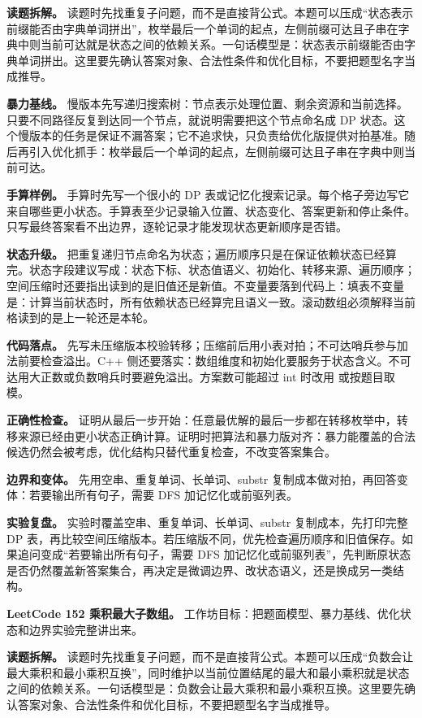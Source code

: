 \textbf{读题拆解。} 读题时先找重复子问题，而不是直接背公式。本题可以压成“状态表示前缀能否由字典单词拼出”，枚举最后一个单词的起点，左侧前缀可达且子串在字典中则当前可达就是状态之间的依赖关系。一句话模型是：状态表示前缀能否由字典单词拼出。这里要先确认答案对象、合法性条件和优化目标，不要把题型名字当成推导。

\textbf{暴力基线。} 慢版本先写递归搜索树：节点表示处理位置、剩余资源和当前选择。只要不同路径反复到达同一个节点，就说明需要把这个节点命名成 DP 状态。这个慢版本的任务是保证不漏答案；它不追求快，只负责给优化版提供对拍基准。随后再引入优化抓手：枚举最后一个单词的起点，左侧前缀可达且子串在字典中则当前可达。

\textbf{手算样例。} 手算时先写一个很小的 DP 表或记忆化搜索记录。每个格子旁边写它来自哪些更小状态。手算表至少记录输入位置、状态变化、答案更新和停止条件。只写最终答案看不出边界，逐轮记录才能发现状态更新顺序是否错。

\textbf{状态升级。} 把重复递归节点命名为状态；遍历顺序只是在保证依赖状态已经算完。状态字段建议写成：状态下标、状态值语义、初始化、转移来源、遍历顺序；空间压缩时还要指出读到的是旧值还是新值。不变量要落到代码上：填表不变量是：计算当前状态时，所有依赖状态已经算完且语义一致。滚动数组必须解释当前格读到的是上一轮还是本轮。

\textbf{代码落点。} 先写未压缩版本校验转移；压缩前后用小表对拍；不可达哨兵参与加法前要检查溢出。C++ 侧还要落实：数组维度和初始化要服务于状态含义。不可达用大正数或负数哨兵时要避免溢出。方案数可能超过 int 时改用  或按题目取模。

\textbf{正确性检查。} 证明从最后一步开始：任意最优解的最后一步都在转移枚举中，转移来源已经由更小状态正确计算。证明时把算法和暴力版对齐：暴力能覆盖的合法候选仍然会被考虑，优化结构只替代重复检查，不改变答案集合。

\textbf{边界和变体。} 先用空串、重复单词、长单词、substr 复制成本做对拍，再回答变体：若要输出所有句子，需要 DFS 加记忆化或前驱列表。

\textbf{实验复盘。} 实验时覆盖空串、重复单词、长单词、substr 复制成本，先打印完整 DP 表，再比较空间压缩版本。若压缩版不同，优先检查遍历顺序和旧值保存。如果追问变成“若要输出所有句子，需要 DFS 加记忆化或前驱列表”，先判断原状态是否仍然覆盖新答案集合，再决定是微调边界、改状态语义，还是换成另一类结构。

\noindent\textbf{LeetCode 152 乘积最大子数组。} 工作坊目标：把题面模型、暴力基线、优化状态和边界实验完整讲出来。

\textbf{读题拆解。} 读题时先找重复子问题，而不是直接背公式。本题可以压成“负数会让最大乘积和最小乘积互换”，同时维护以当前位置结尾的最大和最小乘积就是状态之间的依赖关系。一句话模型是：负数会让最大乘积和最小乘积互换。这里要先确认答案对象、合法性条件和优化目标，不要把题型名字当成推导。

